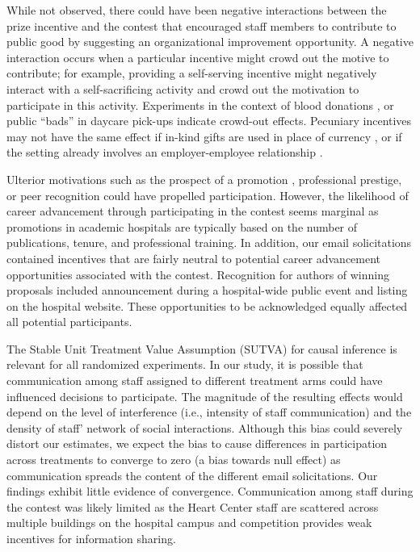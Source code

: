 \documentclass[11pt, titlepage]{article}
\begin{document}
While not observed, there could have been negative interactions between
the prize incentive and the contest that encouraged staff members to
contribute to public good by suggesting an organizational improvement
opportunity. A negative interaction occurs when a particular incentive
might crowd out the motive to contribute; for example, providing a
self-serving incentive might negatively interact with a self-sacrificing
activity and crowd out the motivation to participate in this activity.
Experiments in the context of blood donations
\citep{lacetera2013economic, lacetera2014rewarding}, or public ``bads''
in daycare pick-ups \citep{gneezy2000fine} indicate crowd-out effects.
Pecuniary incentives may not have the same effect if in-kind gifts are
used in place of currency \citep[e.g.,][]{kube2012currency}, or if the
setting already involves an employer-employee relationship
\citep[e.g,][]{fehr1998gift}.

Ulterior motivations such as the prospect of a promotion
\citep{baker1994internal, gibbs1995incentive}, professional prestige, or
peer recognition \citep{kosfeld2011getting, blanes2011tournaments} could
have propelled participation. However, the likelihood of career
advancement through participating in the contest seems marginal as
promotions in academic hospitals are typically based on the number of
publications, tenure, and professional training. In addition, our email
solicitations contained incentives that are fairly neutral to potential
career advancement opportunities associated with the contest.
Recognition for authors of winning proposals included announcement
during a hospital-wide public event and listing on the hospital website.
These opportunities to be acknowledged equally affected all potential
participants.

The Stable Unit Treatment Value Assumption (SUTVA) for causal inference
\citep{rubin1974estimating} is relevant for all randomized experiments.
In our study, it is possible that communication among staff assigned to
different treatment arms could have influenced decisions to participate.
The magnitude of the resulting effects would depend on the level of
interference (i.e., intensity of staff communication) and the density of
staff' network of social interactions. Although this bias could severely
distort our estimates, we expect the bias to cause differences in
participation across treatments to converge to zero (a bias towards null
effect) as communication spreads the content of the different email
solicitations. Our findings exhibit little evidence of convergence.
Communication among staff during the contest was likely limited as the
Heart Center staff are scattered across multiple buildings on the
hospital campus and competition provides weak incentives for information
sharing.
\end{document}
